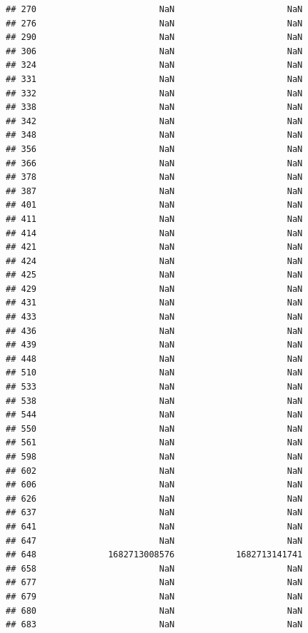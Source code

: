 \documentclass[
]{article}
\begin{document}
\begin{verbatim}
## 270                        NaN                      NaN
## 276                        NaN                      NaN
## 290                        NaN                      NaN
## 306                        NaN                      NaN
## 324                        NaN                      NaN
## 331                        NaN                      NaN
## 332                        NaN                      NaN
## 338                        NaN                      NaN
## 342                        NaN                      NaN
## 348                        NaN                      NaN
## 356                        NaN                      NaN
## 366                        NaN                      NaN
## 378                        NaN                      NaN
## 387                        NaN                      NaN
## 401                        NaN                      NaN
## 411                        NaN                      NaN
## 414                        NaN                      NaN
## 421                        NaN                      NaN
## 424                        NaN                      NaN
## 425                        NaN                      NaN
## 429                        NaN                      NaN
## 431                        NaN                      NaN
## 433                        NaN                      NaN
## 436                        NaN                      NaN
## 439                        NaN                      NaN
## 448                        NaN                      NaN
## 510                        NaN                      NaN
## 533                        NaN                      NaN
## 538                        NaN                      NaN
## 544                        NaN                      NaN
## 550                        NaN                      NaN
## 561                        NaN                      NaN
## 598                        NaN                      NaN
## 602                        NaN                      NaN
## 606                        NaN                      NaN
## 626                        NaN                      NaN
## 637                        NaN                      NaN
## 641                        NaN                      NaN
## 647                        NaN                      NaN
## 648              1682713008576            1682713141741
## 658                        NaN                      NaN
## 677                        NaN                      NaN
## 679                        NaN                      NaN
## 680                        NaN                      NaN
## 683                        NaN                      NaN

\end{verbatim}
\end{document}

